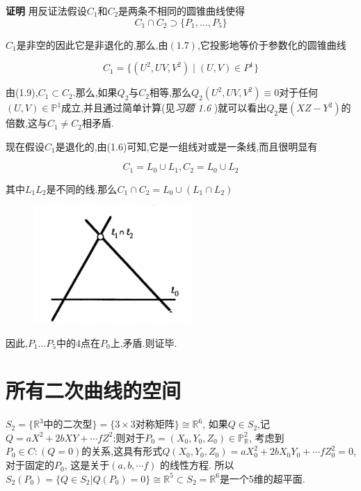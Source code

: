 \documentclass[UTF8]{book}
\begin{document}
		
		\textbf{证明} 用反证法假设$C_{1}$和$C_{2}$是两条不相同的圆锥曲线使得
		\begin{equation*}
		C_{1} \cap C_{2} \supset \{ P_{1},...,P_{5}\}
		\end{equation*}
	
		$C_{1}$是非空的因此它是非退化的,那么,由$ (1.7) $,它投影地等价于参数化的圆锥曲线
		
		\begin{equation*}
		C_{1}=\{(U^{2},UV,V^{2}) \mid (U,V)\in P^{1}\}
		\end{equation*}
	
		由(1.9),$C_{1} \subset C_{2}$.那么,如果$Q_{2}$与$C_{2}$相等,那么$Q_{2}(U^{2},UV,V^{2})\equiv 0$对于任何$(U,V)\in \mathbb{P}^{1}$成立,并且通过简单计算(见\textit{习题 1.6 })就可以看出$Q_{2}$是$(XZ-Y^{2})$的倍数,这与$C_{1}\ne C_{2}$相矛盾.
		
		
		现在假设$C_{1}$是退化的,由(1.6)可知,它是一组线对或是一条线,而且很明显有
		
		\begin{equation*}
		C_{1}=L_{0}\cup L_{1},C_{2}=L_{0}\cup L_{2}
		\end{equation*}
	
		其中$ L_{1} L_{2} $是不同的线.那么$C_{1}\cap C_{2}=L_{0}\cup (L_{1}\cap L_{2})$
	\begin{figure}[H]
	  \centering
	  \includegraphics[width=6cm]{19.jpg}
	\end{figure}
		因此,$P_{1}...P_{5}$中的4点在$P_{0}$上,矛盾.则证毕.
		
	\section{所有二次曲线的空间}
		$S_{2}=\{\mathbb{R}^{3} \text{中的二次型}\}=\{3\times3\text{对称矩阵}\}\cong \mathbb{R}^{6}$, 如果$Q\in S_{2}$,记 $Q=aX^{2}+2bXY+\cdots fZ^{2}$;则对于$P_{0}=(X_{0},Y_{0},Z_{0})\in \mathbb{P}^{2}_{\mathbb{R}}$, 考虑到$P_{0}\in C:(Q=0)$的关系,这具有形式$Q(X_{0},Y_{0},Z_{0})=aX^{2}_{0}+2bX_{0}Y_{0}+\cdots fZ_{0}^{2}=0$, 对于固定的$P_{0}$, 这是关于$(a,b,\cdots f)$ 的线性方程. 所以$S_{2}(P_{0})=\{Q\in S_{2}|Q(P_{0})=0\}\cong \mathbb{R}^{5}\subset S_{2}=\mathbb{R}^{6}$是一个5维的超平面.
		
\end{document}
